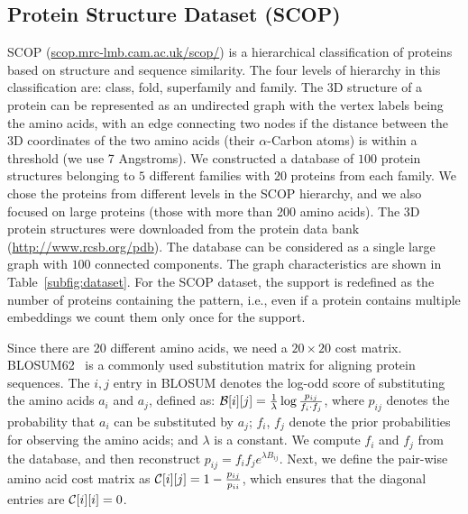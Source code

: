 


\subsection{Protein Structure Dataset (SCOP)}
SCOP (\url{scop.mrc-lmb.cam.ac.uk/scop/}) 
is a hierarchical classification of proteins based on structure
and sequence similarity. The four levels of hierarchy in this
classification are: class, fold, superfamily and family.  The 3D
structure of a protein can be represented as an undirected graph with
the vertex labels being the amino acids, with an edge connecting two
nodes if the distance between the 
3D coordinates of the two amino acids (their
$\alpha$-Carbon atoms) is within a threshold (we use 7 Angstroms).
We constructed a database of
$100$ protein structures belonging to $5$ different families with $20$
proteins from each family. 
We chose the proteins from different levels in the SCOP hierarchy, and
we also focused on large proteins (those with more than 200 amino
acids). 
The 3D protein structures were downloaded from the
protein data bank (\url{http://www.rcsb.org/pdb}).  The database
can be considered as a single large graph with $100$ connected
components. The graph characteristics are shown in
Table~\ref{subfig:dataset}. 
For the SCOP dataset, the support is redefined as 
the number of proteins containing the pattern, i.e., 
even if a protein contains multiple embeddings we count them only once for the support.

\smallskip{}
Since there are 20 different amino acids, we need a $20 \times 20$ cost
matrix. BLOSUM62~\cite{HH92} is a commonly used substitution matrix for aligning protein
sequences.  The $i,j$ entry in BLOSUM denotes the log-odd score
of substituting the amino acids $a_i$ and $a_j$, defined as:
$\mathcal{B}[i][j] = \frac{1}{\lambda} 
	\log\frac{p_{ij}}{f_i \cdot f_j}$,
where $p_{ij}$ denotes the probability that  $a_i$ can be
substituted by $a_j$; 
$f_i$, $f_j$ denote the prior probabilities for observing the 
amino acids; and $\lambda$ is a constant. We compute $f_i$ and $f_j$
from the database, and then reconstruct $p_{ij}=f_if_j e^{\lambda
B_{ij}}$. Next, we define the pair-wise amino acid cost matrix as
$\mathcal{C}[i][j] = 1-\frac{p_{ij}}{p_{ii}}$, which ensures that
the diagonal entries are $\mathcal{C}[i][i] =0$.

